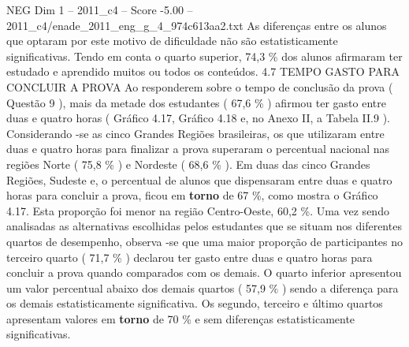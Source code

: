 \begin{textsample}{NEG Dim 1 – 2011\_c4 – Score -5.00 – 2011\_c4/enade\_2011\_eng\_g\_4\_974c613aa2.txt}
As diferenças entre os alunos que optaram por este motivo de dificuldade não são estatisticamente significativas.
Tendo em conta o quarto superior, 74,3 \% dos alunos afirmaram ter estudado e aprendido muitos ou todos os conteúdos. 4.7 TEMPO GASTO PARA CONCLUIR A PROVA Ao responderem sobre o tempo de conclusão da prova ( Questão 9 ), mais da metade dos estudantes ( 67,6 \% ) afirmou ter gasto entre duas e quatro horas ( Gráfico 4.17, Gráfico 4.18 e, no Anexo II, a Tabela II.9 ).
Considerando -se as cinco Grandes Regiões brasileiras, os que utilizaram entre duas e quatro horas para finalizar a prova superaram o percentual nacional nas regiões Norte ( 75,8 \% ) e Nordeste ( 68,6 \% ).
Em duas das cinco Grandes Regiões, Sudeste e, o percentual de alunos que dispensaram entre duas e quatro horas para concluir a prova, ficou em \textbf{torno} de 67 \%, como mostra o Gráfico 4.17.
Esta proporção foi menor na região Centro-Oeste, 60,2 \%.
Uma vez sendo analisadas as alternativas escolhidas pelos estudantes que se situam nos diferentes quartos de desempenho, observa -se que uma maior proporção de participantes no terceiro quarto ( 71,7 \% ) declarou ter gasto entre duas e quatro horas para concluir a prova quando comparados com os demais.
O quarto inferior apresentou um valor percentual abaixo dos demais quartos ( 57,9 \% ) sendo a diferença para os demais estatisticamente significativa.
Os segundo, terceiro e último quartos apresentam valores em \textbf{torno} de 70 \% e sem diferenças estatisticamente significativas.

\end{textsample}

